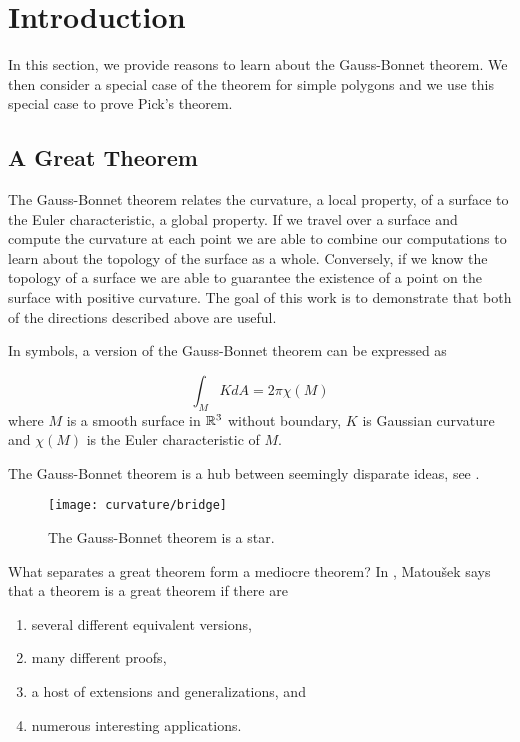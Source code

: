 \section{Introduction}
\label{sec:intro}

In this section, we provide reasons to learn about the Gauss-Bonnet theorem. We then consider a special case of the theorem for simple polygons and we use this special case to prove Pick's theorem.

\subsection{A Great Theorem}
The Gauss-Bonnet theorem relates the curvature, a local property, of a surface
to the Euler characteristic, a global property. If we travel over a surface and compute the curvature
at each point we are able to combine our computations to learn about the topology of the surface
as a whole. Conversely, if we know the topology of a surface we are able to 
guarantee the existence of a point on the surface with positive curvature. 
The goal of this work is to demonstrate that both of the directions described above are useful.


In symbols, a version of the Gauss-Bonnet theorem can be expressed as

\begin{equation}\label{eqn:g-b-noboundary}
		\int_MK dA =2\pi \chi(M)
\end{equation}
where $M$ is a smooth surface in $\mathbb{R}^3$ without boundary, $K$ is Gaussian curvature
and $\chi(M)$ is the Euler characteristic of $M$.


The Gauss-Bonnet theorem is a hub between seemingly disparate ideas, see . 

\begin{figure}[htb]
\centering
\texttt{[image: curvature/bridge]}
\caption{The Gauss-Bonnet theorem is a star.}
\label{fig:bridge}
\end{figure}

What separates a great theorem form a mediocre theorem?
In \cite{jm08}, Matou\v{s}ek says that a theorem is a great theorem if there are
\begin{enumerate}[(1)]
\item several different equivalent versions,
\item many different proofs,
\item a host of extensions and generalizations, and
\item numerous interesting applications.
\end{enumerate}

